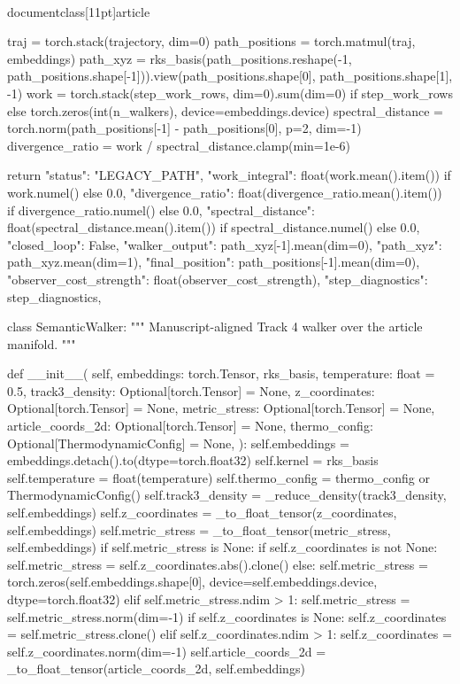\\documentclass[11pt]{article}
\begin{document}
\begin{CodeBlock}
    traj = torch.stack(trajectory, dim=0)
    path_positions = torch.matmul(traj, embeddings)
    path_xyz = rks_basis(path_positions.reshape(-1, path_positions.shape[-1])).view(path_positions.shape[0], path_positions.shape[1], -1)
    work = torch.stack(step_work_rows, dim=0).sum(dim=0) if step_work_rows else torch.zeros(int(n_walkers), device=embeddings.device)
    spectral_distance = torch.norm(path_positions[-1] - path_positions[0], p=2, dim=-1)
    divergence_ratio = work / spectral_distance.clamp(min=1e-6)

    return {
        "status": "LEGACY_PATH",
        "work_integral": float(work.mean().item()) if work.numel() else 0.0,
        "divergence_ratio": float(divergence_ratio.mean().item()) if divergence_ratio.numel() else 0.0,
        "spectral_distance": float(spectral_distance.mean().item()) if spectral_distance.numel() else 0.0,
        "closed_loop": False,
        "walker_output": path_xyz[-1].mean(dim=0),
        "path_xyz": path_xyz.mean(dim=1),
        "final_position": path_positions[-1].mean(dim=0),
        "observer_cost_strength": float(observer_cost_strength),
        "step_diagnostics": step_diagnostics,
    }


class SemanticWalker:
    """
    Manuscript-aligned Track 4 walker over the article manifold.
    """

    def __init__(
        self,
        embeddings: torch.Tensor,
        rks_basis,
        temperature: float = 0.5,
        track3_density: Optional[torch.Tensor] = None,
        z_coordinates: Optional[torch.Tensor] = None,
        metric_stress: Optional[torch.Tensor] = None,
        article_coords_2d: Optional[torch.Tensor] = None,
        thermo_config: Optional[ThermodynamicConfig] = None,
    ):
        self.embeddings = embeddings.detach().to(dtype=torch.float32)
        self.kernel = rks_basis
        self.temperature = float(temperature)
        self.thermo_config = thermo_config or ThermodynamicConfig()
        self.track3_density = _reduce_density(track3_density, self.embeddings)
        self.z_coordinates = _to_float_tensor(z_coordinates, self.embeddings)
        self.metric_stress = _to_float_tensor(metric_stress, self.embeddings)
        if self.metric_stress is None:
            if self.z_coordinates is not None:
                self.metric_stress = self.z_coordinates.abs().clone()
            else:
                self.metric_stress = torch.zeros(self.embeddings.shape[0], device=self.embeddings.device, dtype=torch.float32)
        elif self.metric_stress.ndim > 1:
            self.metric_stress = self.metric_stress.norm(dim=-1)
        if self.z_coordinates is None:
            self.z_coordinates = self.metric_stress.clone()
        elif self.z_coordinates.ndim > 1:
            self.z_coordinates = self.z_coordinates.norm(dim=-1)
        self.article_coords_2d = _to_float_tensor(article_coords_2d, self.embeddings)


\end{CodeBlock}
\end{document}
